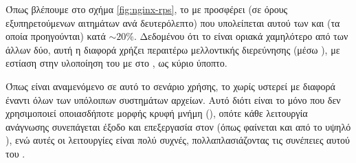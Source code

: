 Όπως βλέπουμε στο σχήμα \ref{fig:nginx-rps}, το \viofs{} με 
προσφέρει  (σε όρους εξυπηρετούμενων αιτημάτων ανά δευτερόλεπτο)
που υπολείπεται αυτού των  και  (τα οποία προηγούνται) κατά
\(\sim 20\%\). Δεδομένου ότι το  είναι οριακά χαμηλότερο από των
άλλων δύο, αυτή η διαφορά χρήζει περαιτέρω μελλοντικής διερεύνησης (μέσω
), με εστίαση στην υλοποίηση του \viofs{} με  στο \osv{}, ως κύριο ύποπτο.

Όπως είναι αναμενόμενο σε αυτό το σενάριο χρήσης, το \viofs{} χωρίς 
υστερεί με διαφορά έναντι όλων των υπόλοιπων συστημάτων αρχείων. Αυτό διότι
είναι το μόνο που δεν χρησιμοποιεί οποιασδήποτε μορφής κρυφή μνήμη (),
οπότε κάθε λειτουργία ανάγνωσης συνεπάγεται έξοδο και επεξεργασία στον \host{}
(όπως φαίνεται και από το υψηλό ), ενώ αυτές οι λειτουργίες είναι
πολύ συχνές, πολλαπλασιάζοντας τις συνέπειες αυτού του .
